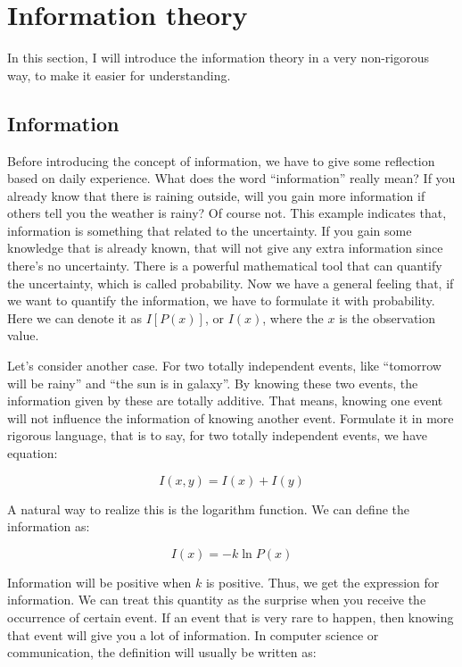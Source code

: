 \documentclass[../main.tex]{subfiles}
\begin{document}
\section{\textbf{Information theory}}

In this section, I will introduce the information theory in a very non-rigorous way, to make it easier for understanding.

\subsection{Information}
Before introducing the concept of information, we have to give some reflection based on daily experience. What does the word ``information'' really mean? If you already know that there is raining outside, will you gain more information if others tell you the weather is rainy? Of course not. This example indicates that, information is something that related to the uncertainty. If you gain some knowledge that is already known, that will not give any extra information since there's no uncertainty. There is a powerful mathematical tool that can quantify the uncertainty, which is called probability. Now we have a general feeling that, if we want to quantify the information, we have to formulate it with probability. Here we can denote it as $I[P(x)]$, or $I(x)$, where the $x$ is the observation value. 

Let's consider another case. For two totally independent events, like ``tomorrow will be rainy'' and ``the sun is in galaxy''. By knowing these two events, the information given by these are totally additive. That means, knowing one event will not influence the information of knowing another event. Formulate it in more rigorous language, that is to say, for two totally independent events, we have equation: 

\begin{equation}
    I(x, y) = I(x) + I(y)
\end{equation}

A natural way to realize this is the logarithm function. We can define the information as:

\begin{equation}
    I(x) = -k\ln P(x)
\end{equation}

Information will be positive when $k$ is positive. Thus, we get the expression for information. We can treat this quantity as the surprise when you receive the occurrence of certain event. If an event that is very rare to happen, then knowing that event will give you a lot of information. In computer science or communication, the definition will usually be written as:
\end{document}
